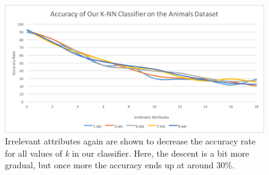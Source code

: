 \documentclass{article}
\begin{document}
\begin{figure}[hbt]
\centering
\includegraphics[scale=0.7]{our-knn-animals-full} 
\caption{Irrelevant attributes again are shown to decrease the accuracy rate for all values of \textit{k} in our classifier. Here, the descent is a bit more gradual, but once more the accuracy ends up at around 30\%.}
\end{figure}
\end{document}
